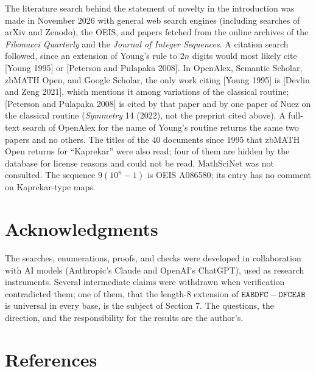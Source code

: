 \documentclass[11pt,letterpaper]{article}
\theoremstyle{paperstyle}
\theoremstyle{paperstyledef}
\theoremstyle{paperstylerem}
\begin{document}
The literature search behind the statement of novelty in the introduction was made in November 2026 with general web search engines (including searches of arXiv and Zenodo), the OEIS, and papers fetched from the online archives of the \emph{Fibonacci Quarterly} and the \emph{Journal of Integer Sequences}. A citation search followed, since an extension of Young's rule to \(2n\) digits would most likely cite {[}Young 1995{]} or {[}Peterson and Pulapaka 2008{]}. In OpenAlex, Semantic Scholar, zbMATH Open, and Google Scholar, the only work citing {[}Young 1995{]} is {[}Devlin and Zeng 2021{]}, which mentions it among variations of the classical routine; {[}Peterson and Pulapaka 2008{]} is cited by that paper and by one paper of Nuez on the classical routine (\emph{Symmetry} 14 (2022), not the preprint cited above). A full-text search of OpenAlex for the name of Young's routine returns the same two papers and no others. The titles of the \(40\) documents since 1995 that zbMATH Open returns for ``Kaprekar'' were also read; four of them are hidden by the database for license reasons and could not be read. MathSciNet was not consulted. The sequence \(9(10^n - 1)\) is OEIS A086580; its entry has no comment on Kaprekar-type maps.

\section*{Acknowledgments}\label{acknowledgments}

The searches, enumerations, proofs, and checks were developed in collaboration with AI models (Anthropic's Claude and OpenAI's ChatGPT), used as research instruments. Several intermediate claims were withdrawn when verification contradicted them; one of them, that the length-\(8\) extension of \(\mathtt{EABDFC} - \mathtt{DFCEAB}\) is universal in every base, is the subject of Section 7. The questions, the direction, and the responsibility for the results are the author's.

\section*{References}\label{references}
\end{document}
